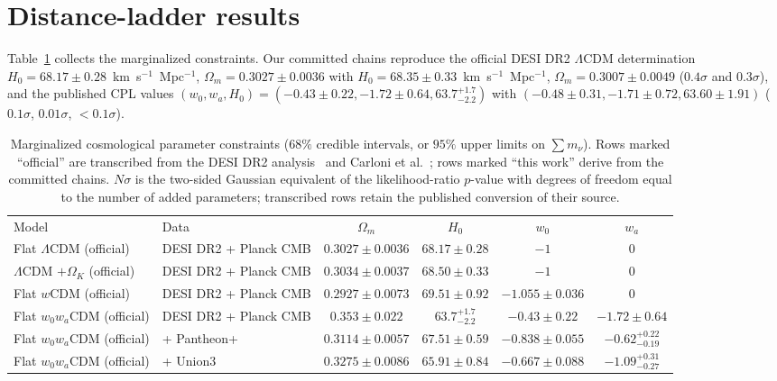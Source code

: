 \documentclass[aps,prd,twocolumn,superscriptaddress,nofootinbib]{revtex4-2}
\begin{document}
\section{Distance-ladder results}
\label{sec:results}

Table~\ref{tab:constraints} collects the marginalized constraints. Our committed chains reproduce the official DESI DR2 $\Lambda$CDM determination $H_0 = 68.17 \pm 0.28$~km~s$^{-1}$~Mpc$^{-1}$, $\Omega_m = 0.3027 \pm 0.0036$ with $H_0 = 68.35 \pm 0.33$~km~s$^{-1}$~Mpc$^{-1}$, $\Omega_m = 0.3007 \pm 0.0049$ ($0.4\sigma$ and $0.3\sigma$), and the published CPL values $(w_0, w_a, H_0) = (-0.43 \pm 0.22, -1.72 \pm 0.64, 63.7^{+1.7}_{-2.2})$ with $(-0.48 \pm 0.31, -1.71 \pm 0.72, 63.60 \pm 1.91)$ ($0.1\sigma$, $0.01\sigma$, $<0.1\sigma$).

\begin{table}[t]
\caption{Marginalized cosmological parameter constraints ($68\%$ credible intervals, or $95\%$ upper limits on $\sum m_\nu$). Rows marked ``official'' are transcribed from the DESI DR2 analysis~\cite{DESI2025} and Carloni et al.~\cite{Carloni2026}; rows marked ``this work'' derive from the committed chains. $N\sigma$ is the two-sided Gaussian equivalent of the likelihood-ratio $p$-value with degrees of freedom equal to the number of added parameters; transcribed rows retain the published conversion of their source.}
\label{tab:constraints}
\begin{ruledtabular}
\begin{tabular}{llcccc}
Model & Data & $\Omega_m$ & $H_0$ & $w_0$ & $w_a$ \\
\colrule
Flat $\Lambda$CDM (official) & DESI DR2 + Planck CMB & $0.3027 \pm 0.0036$ & $68.17 \pm 0.28$ & $-1$ & $0$ \\
$\Lambda$CDM $+\Omega_K$ (official) & DESI DR2 + Planck CMB & $0.3034 \pm 0.0037$ & $68.50 \pm 0.33$ & $-1$ & $0$ \\
Flat $w$CDM (official) & DESI DR2 + Planck CMB & $0.2927 \pm 0.0073$ & $69.51 \pm 0.92$ & $-1.055 \pm 0.036$ & $0$ \\
Flat $w_0w_a$CDM (official) & DESI DR2 + Planck CMB & $0.353 \pm 0.022$ & $63.7^{+1.7}_{-2.2}$ & $-0.43 \pm 0.22$ & $-1.72 \pm 0.64$ \\
Flat $w_0w_a$CDM (official) & + Pantheon+ & $0.3114 \pm 0.0057$ & $67.51 \pm 0.59$ & $-0.838 \pm 0.055$ & $-0.62^{+0.22}_{-0.19}$ \\
Flat $w_0w_a$CDM (official) & + Union3 & $0.3275 \pm 0.0086$ & $65.91 \pm 0.84$ & $-0.667 \pm 0.088$ & $-1.09^{+0.31}_{-0.27}$ \\

\end{tabular}
\end{ruledtabular}
\end{table}
\end{document}
